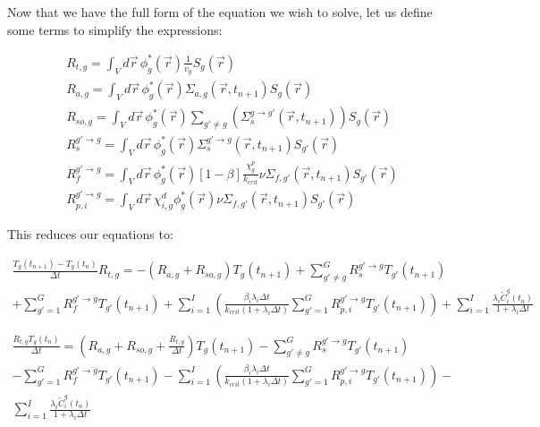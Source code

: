 \documentclass[12pt]{report}
\begin{document}
		Now that we have the full form of the equation we wish to solve, let us define some terms to simplify the expressions:
		
		
		\begin{eqnarray}
		R_{t,g} = \int_{V} d\vec{r} \, \phi_g^*(\vec{r}) \frac{1}{v_g}  S_g(\vec{r}) \\
		R_{a,g} = \int_{V} d\vec{r} \, \phi_g^*(\vec{r}) \Sigma_{a,g}(\vec{r},t_{n+1})  S_g(\vec{r}) \\
		R_{so,g} = \int_{V} d\vec{r} \, \phi_g^*(\vec{r}) \sum_{g'\neq g} \left( \Sigma_{s}^{g\rightarrow g'}(\vec{r},t_{n+1}) \right)  S_g(\vec{r}) \\
		R_{s}^{g'\rightarrow g} = \int_{V}  d\vec{r} \, \phi_g^*(\vec{r})  \Sigma_{s}^{g'\rightarrow g} (\vec{r},t_{n+1})  S_{g'}(\vec{r}) \\
		R_{f}^{g' \rightarrow g} = \int_{V} d\vec{r} \, \phi_g^*(\vec{r}) \left[ 1- \beta \right] \frac{\chi_g^p}{k_{crit}} \nu \Sigma_{f,g'}(\vec{r},t_{n+1}) S_{g'}(\vec{r}) \\
		R_{p,i}^{g' \rightarrow g} = \int_{V} d\vec{r} \, \chi^d_{i,g} \phi_g^*(\vec{r}) \nu \Sigma_{f,g'}(\vec{r},t_{n+1}) S_{g'}(\vec{r})
		\end{eqnarray}
		
		This reduces our equations to:
		
		\begin{eqnarray} 
		\frac{ T_g(t_{n+1}) - T_g(t_{n})}{\Delta t} R_{t,g} = - \left( R_{a,g} + R_{so,g} \right) T_g(t_{n+1}) + \sum_{g'\neq g}^{G} R_s^{g' \rightarrow g} T_{g'}(t_{n+1}) \nonumber \\
		+ \sum_{g'=1}^{G} R_f^{g' \rightarrow g} T_{g'}(t_{n+1}) + \sum_{i=1}^{I} \left( \frac{\beta_i \lambda_i \Delta t}{k_{crit}\left(1+\lambda_i \Delta t\right)} \sum_{g'=1}^{G} R_{p,i}^{g' \rightarrow g} T_{g'}(t_{n+1}) \right) + \sum_{i=1}^{I} \frac{\lambda_i \tilde{C}_i^g(t_{n})}{1+\lambda_i \Delta t}
		\end{eqnarray}
		

		
		\begin{eqnarray} 
		\frac{R_{t,g} T_g(t_{n})}{\Delta t} = \left( R_{a,g} + R_{so,g} + \frac{R_{t,g}}{\Delta t} \right) T_g(t_{n+1}) - \sum_{g'\neq g}^{G} R_s^{g' \rightarrow g} T_{g'}(t_{n+1}) \nonumber \\
		- \sum_{g'=1}^{G} R_f^{g' \rightarrow g} T_{g'}(t_{n+1}) - \sum_{i=1}^{I} \left( \frac{\beta_i \lambda_i \Delta t}{k_{crit}\left(1+\lambda_i \Delta t \right)} \sum_{g'=1}^{G} R_{p,i}^{g' \rightarrow g} T_{g'}(t_{n+1}) \right) - \nonumber \\
		\sum_{i=1}^{I} \frac{\lambda_i \tilde{C}_i^g(t_{n})}{1+\lambda_i \Delta t}
		\end{eqnarray}	
		
\end{document}
